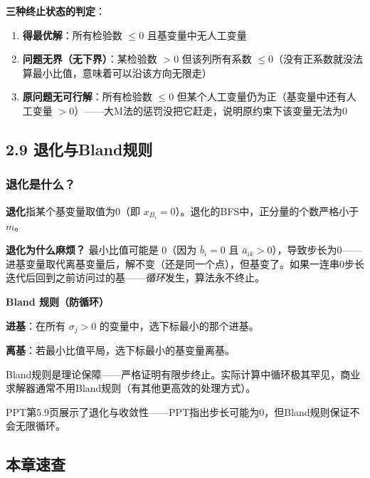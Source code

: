 {\begin{notebox}
\textbf{三种终止状态的判定}：
\begin{enumerate}
  \item \textbf{得最优解}：所有检验数 $\le 0$ 且基变量中无人工变量
  \item \textbf{问题无界（无下界）}：某检验数 $>0$ 但该列所有系数 $\le 0$（没有正系数就没法算最小比值，意味着可以沿该方向无限走）
  \item \textbf{原问题无可行解}：所有检验数 $\le 0$ 但某个人工变量仍为正（基变量中还有人工变量 $>0$）——大M法的惩罚没把它赶走，说明原约束下该变量无法为0
\end{enumerate}
\end{notebox}}

\subsection{2.9 退化与Bland规则}

\subsubsection{退化是什么？}

\textbf{退化}指某个基变量取值为0（即 $x_{B_i}=0$）。退化的BFS中，正分量的个数严格小于 $m$。

\textbf{退化为什么麻烦？} 最小比值可能是 $0$（因为 $\bar{b}_i=0$ 且 $\bar{a}_{ik}>0$），导致步长为0——进基变量取代离基变量后，解不变（还是同一个点），但基变了。如果一连串0步长迭代后回到之前访问过的基——\emph{循环}发生，算法永不终止。

\begin{defbox}
\textbf{Bland 规则（防循环）}

\textbf{进基}：在所有 $\sigma_j>0$ 的变量中，选下标最小的那个进基。

\textbf{离基}：若最小比值平局，选下标最小的基变量离基。

Bland规则是理论保障——严格证明有限步终止。实际计算中循环极其罕见，商业求解器通常不用Bland规则（有其他更高效的处理方式）。
\end{defbox}

PPT第5.9页展示了退化与收敛性——PPT指出步长可能为0，但Bland规则保证不会无限循环。

\medskip
{}
\medskip

\clearpage\subsection{本章速查}

